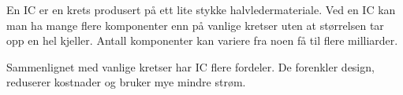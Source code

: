 En IC er en krets produsert på ett lite stykke halvledermateriale.
Ved en IC kan man ha mange flere komponenter enn på vanlige kretser uten at
størrelsen tar opp en hel kjeller.
Antall komponenter kan variere fra noen få til flere milliarder.

Sammenlignet med vanlige kretser har IC flere fordeler.
De forenkler design, reduserer kostnader og bruker mye mindre strøm.
